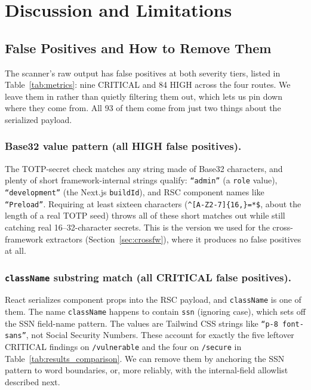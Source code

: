 \documentclass[runningheads]{llncs}
\begin{document}
\section{Discussion and Limitations}
\label{sec:discussion}

\subsection{False Positives and How to Remove Them}

The scanner's raw output has false positives at both severity tiers,
listed in Table~\ref{tab:metrics}: nine CRITICAL and 84 HIGH across the
four routes.  We leave them in rather than quietly filtering them out,
which lets us pin down where they come from.  All 93 of them come from
just two things about the serialized payload.

\subsubsection{Base32 value pattern (all HIGH false positives).}
The TOTP-secret check matches any string made of Base32 characters, and
plenty of short framework-internal strings qualify: \texttt{``admin''} (a
\texttt{role} value), \texttt{``development''} (the Next.js
\texttt{buildId}), and RSC component names like \texttt{``Preload''}.
Requiring at least sixteen characters (\texttt{\^{}[A-Z2-7]\{16,\}=*\$},
about the length of a real TOTP seed) throws all of these short matches
out while still catching real 16--32-character secrets.  This is the
version we used for the cross-framework extractors
(Section~\ref{sec:crossfw}), where it produces no false positives at all.

\subsubsection{\texttt{className} substring match (all CRITICAL false positives).}
React serializes component props into the RSC payload, and
\texttt{className} is one of them.  The name \texttt{className} happens to
contain \texttt{ssn} (ignoring case), which sets off the SSN field-name
pattern.  The values are Tailwind CSS strings like \texttt{``p-8
font-sans''}, not Social Security Numbers.  These account for exactly the
five leftover CRITICAL findings on \texttt{/vulnerable} and the four on
\texttt{/secure} in Table~\ref{tab:results_comparison}.  We can remove them
by anchoring the SSN pattern to word boundaries, or, more reliably, with
the internal-field allowlist described next.
\end{document}

